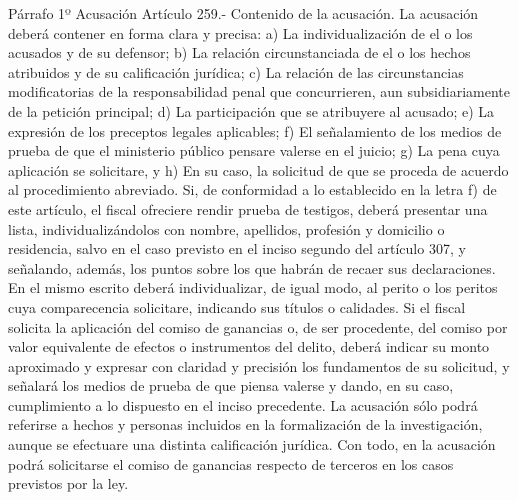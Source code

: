     Párrafo 1º Acusación
    Artículo 259.- Contenido de la acusación. La acusación deberá contener en forma clara y precisa:
    a) La individualización de el o los acusados y de su defensor;
    b) La relación circunstanciada de el o los hechos atribuidos y de su calificación jurídica;
    c) La relación de las circunstancias modificatorias de la responsabilidad penal que concurrieren, aun subsidiariamente de la petición principal;
    d) La participación que se atribuyere al acusado;
    e) La expresión de los preceptos legales aplicables;
    f) El señalamiento de los medios de prueba de que el ministerio público pensare valerse en el juicio;
    g) La pena cuya aplicación se solicitare, y h) En su caso, la solicitud de que se proceda de acuerdo al procedimiento abreviado.
    Si, de conformidad a lo establecido en la letra f) de este artículo, el fiscal ofreciere rendir prueba de testigos, deberá presentar una lista, individualizándolos con nombre, apellidos, profesión y domicilio o residencia, salvo en el caso previsto en el inciso segundo del artículo 307, y señalando, además, los puntos sobre los que habrán de recaer sus declaraciones. En el mismo escrito deberá individualizar, de igual modo, al perito o los peritos cuya comparecencia solicitare, indicando sus títulos o calidades.
    Si el fiscal solicita la aplicación del comiso de ganancias o, de ser procedente, del comiso por valor equivalente de efectos o instrumentos del delito, deberá indicar su monto aproximado y expresar con claridad y precisión los fundamentos de su solicitud, y señalará los medios de prueba de que piensa valerse y dando, en su caso, cumplimiento a lo dispuesto en el inciso precedente.
    La acusación sólo podrá referirse a hechos y personas incluidos en la formalización de la investigación, aunque se efectuare una distinta calificación jurídica. Con todo, en la acusación podrá solicitarse el comiso de ganancias respecto de terceros en los casos previstos por la ley.

